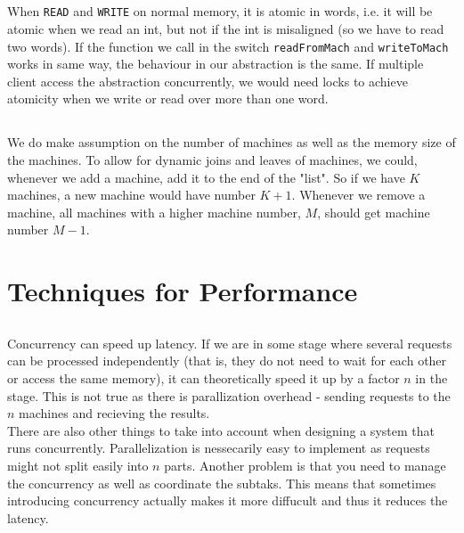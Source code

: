 \documentclass[a4paper]{article}
\begin{document}
\subsection{}
When \texttt{READ} and \texttt{WRITE} on normal memory, it is atomic in words, i.e. it will be atomic when we read an int, but not if the int is misaligned (so we have to read two words). If the function we call in the switch {\texttt{readFromMach} and \texttt{writeToMach}} works in same way, the behaviour in our abstraction is the same. If multiple client access the abstraction concurrently, we would need locks to achieve atomicity when we write or read over more than one word.

\subsection{}
We do make assumption on the number of machines as well as the memory size of the machines. To allow for dynamic joins and leaves of machines, we could, whenever we add a machine, add it to the end of the "list". So if we have $K$ machines, a new machine would have number $K+1$. Whenever we remove a machine, all machines with a higher machine number, $M$, should get machine number $M-1$.

\section{Techniques for Performance}
\subsection{}
Concurrency can speed up latency. If we are in some stage where several requests can be processed independently (that is, they do not need to wait for each other or access the same memory), it can theoretically speed it up by a factor $n$ in the stage. This is not true as there is parallization overhead - sending requests to the $n$ machines and recieving the results. \\
There are also other things to take into account when designing a system that runs concurrently. Parallelization is nessecarily easy to implement as requests might not split easily into $n$ parts. Another problem is that you need to manage the concurrency as well as coordinate the subtaks. This means that sometimes introducing concurrency actually makes it more diffucult and thus it reduces the latency.
\end{document}
